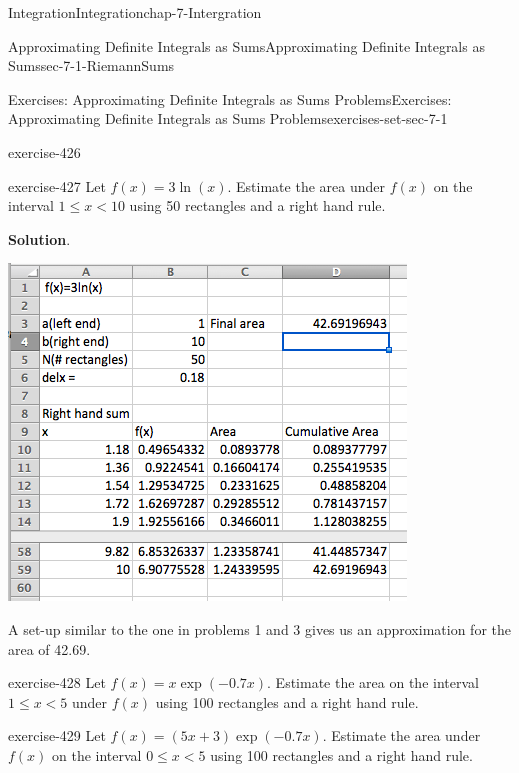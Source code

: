 \documentclass[oneside,10pt,]{book}
\numberwithin{equation}{section}
\newcommand{\lt}{<}
\begin{document}
\begin{chapterptx}{Integration}{}{Integration}{}{}{chap-7-Intergration}
\begin{sectionptx}{Approximating Definite Integrals as Sums}{}{Approximating Definite Integrals as Sums}{}{}{sec-7-1-RiemannSums}
\begin{exercises-subsection-numberless}{Exercises: Approximating Definite Integrals as Sums Problems}{}{Exercises: Approximating Definite Integrals as Sums Problems}{}{}{exercises-set-sec-7-1}
\begin{divisionexercise}{4}{}{}{exercise-426}
\end{divisionexercise}%
\begin{divisionexercise}{5}{}{}{exercise-427}%
\hypertarget{p-2580}{}%
Let \(f(x) = 3 \ln(x)\).  Estimate the area under \(f(x)\) on the interval \(1 \le  x \lt 10\) using 50 rectangles and a right hand rule.%
\par\smallskip%
\noindent\textbf{Solution}.\hypertarget{solution-216}{}\quad%
\leavevmode%
\begin{sidebyside}{1}{0.25}{0.25}{0}%
\begin{sbspanel}{0.5}%
\includegraphics[width=1\linewidth]{images/sec7-1-sol5a.png}
\end{sbspanel}%
\end{sidebyside}%
\par
\hypertarget{p-2581}{}%
A set-up similar to the one in problems 1 and 3 gives us an approximation for the area of  42.69.%
\end{divisionexercise}%
\begin{divisionexercise}{6}{}{}{exercise-428}%
\hypertarget{p-2582}{}%
Let \(f(x) = x \exp(-0.7 x)\).  Estimate the area on the interval \(1 \le  x \lt 5\) under \(f(x)\) using 100 rectangles and a right hand rule.%
\end{divisionexercise}%
\begin{divisionexercise}{7}{}{}{exercise-429}%
\hypertarget{p-2583}{}%
Let \(f(x) = (5 x + 3) \exp(-0.7 x)\).  Estimate the area under \(f(x)\) on the interval \(0 \le  x \lt 5\) using 100 rectangles and a right hand rule.%

\end{divisionexercise}
\end{exercises-subsection-numberless}
\end{sectionptx}
\end{chapterptx}
\end{document}
